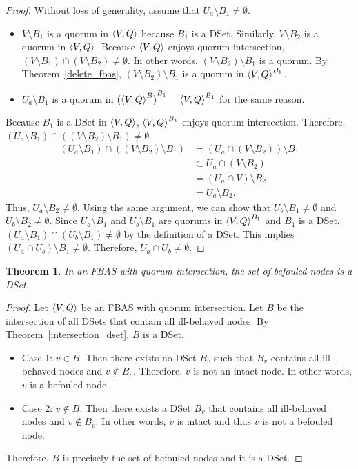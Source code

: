 \documentclass[12pt, psamsfonts]{amsart}
\newtheorem{thm}{Theorem}[section]
\theoremstyle{definition}
\theoremstyle{remark}
\numberwithin{equation}{section}
\begin{document}
\begin{proof}
	Without loss of generality, assume that $U_a \setminus B_1 \ne \emptyset$.
	\begin{itemize}
		\item
			$V \setminus B_1$ is a quorum in $\ev{V, Q}$ because $B_1$ is a DSet.
			Similarly, $V \setminus B_2$ is a quorum in $\ev{V, Q}$.
			Because $\ev{V, Q}$ enjoys quorum intersection, $(V \setminus B_1) \cap (V \setminus B_2) \ne \emptyset$.
			In other words, $(V \setminus B_2) \setminus B_1$ is a quorum.
			By Theorem~\ref{delete_fbas}, $(V \setminus B_2) \setminus B_1$ is a quorum in $\ev{V, Q}^{B_1}$.
		\item
            $U_a \setminus B_1$ is a quorum in ${(\ev{V, Q}^B)}^{B_1} = {\ev{V, Q}}^{B_1}$ for the same reason.
	\end{itemize}
	Because $B_1$ is a DSet in $\ev{V, Q}$, $\ev{V, Q}^{B_1}$ enjoys quorum intersection.
	Therefore, $(U_a \setminus B_1) \cap ((V \setminus B_2) \setminus B_1) \ne \emptyset$.
	\begin{align*}
	  (U_a \setminus B_1) \cap ((V \setminus B_2) \setminus B_1)
		&= (U_a \cap (V \setminus B_2)) \setminus B_1 \\
		&\subset U_a \cap (V \setminus B_2) \\
		&= (U_a \cap V) \setminus B_2 \\
		&= U_a \setminus B_2.
	\end{align*}
	Thus, $U_a \setminus B_2 \ne \emptyset$.
	Using the same argument, we can show that $U_b \setminus B_1 \ne \emptyset$ and $U_b \setminus B_2 \ne \emptyset$.
	Since $U_a \setminus B_1$ and $U_b \setminus B_1$ are quorums in $\ev{V, Q}^{B_1}$ and $B_1$ is a DSet, $(U_a \setminus B_1) \cap (U_b \setminus B_1) \ne \emptyset$ by the definition of a DSet.
	This implies $(U_a \cap U_b) \setminus B_1 \ne \emptyset$.
	Therefore, $U_a \cap U_b \ne \emptyset$.
\end{proof}

\begin{thm}\label{befouled_dset}
	In an FBAS with quorum intersection, the set of befouled nodes is a DSet.
\end{thm}

\begin{proof}
	Let $\ev{V, Q}$ be an FBAS with quorum intersection.
	Let $B$ be the intersection of all DSets that contain all ill-behaved nodes.
	By Theorem~\ref{intersection_dset}, $B$ is a DSet.

	\begin{itemize}
		\item
			Case 1: $v \in B$.
			Then there exists no DSet $B_v$ such that $B_v$ contains all ill-behaved nodes and $v \notin B_v$.
			Therefore, $v$ is not an intact node.
			In other words, $v$ is a befouled node.
		\item
			Case 2: $v \notin B$.
			Then there exists a DSet $B_v$ that contains all ill-behaved nodes and $v \notin B_v$.
			In other words, $v$ is intact and thus $v$ is not a befouled node.
	\end{itemize}

	Therefore, $B$ is precisely the set of befouled nodes and it is a DSet.
\end{proof}
\end{document}
